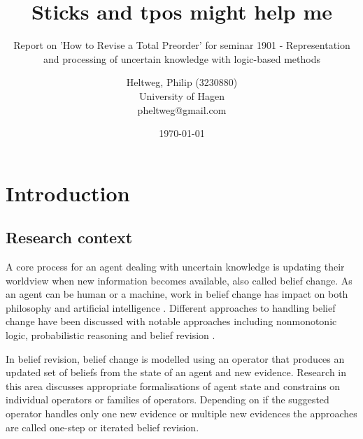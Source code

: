 \documentclass[english, 12pt]{scrartcl}
\theoremstyle{definition}
\theoremstyle{definition}
\theoremstyle{definition}
\begin{document}
\title{Sticks and tpos might help me}
\subtitle{Report on 'How to Revise a Total Preorder' \cite{Booth2011} for seminar 1901 - Representation and processing of uncertain knowledge with logic-based methods}
\author{
	Heltweg, Philip (3230880) \\
	University of Hagen \\
	pheltweg@gmail.com
}
\date{\today}
\maketitle


\newpage

\tableofcontents

\newpage

\section{Introduction}



\subsection{Research context}
A core process for an agent dealing with uncertain knowledge is updating their worldview when new information becomes available, also called belief change. As an agent can be human or a machine, work in belief change has impact on both philosophy and artificial intelligence \cite{Ferme2011}. Different approaches to handling belief change have been discussed with notable approaches including nonmonotonic logic, probabilistic reasoning and belief revision \cite{Darwiche1997}.

In belief revision, belief change is modelled using an operator that produces an updated set of beliefs from the state of an agent and new evidence. Research in this area discusses appropriate formalisations of agent state and constrains on individual operators or families of operators. Depending on if the suggested operator handles only one new evidence or multiple new evidences the approaches are called one-step or iterated belief revision.
\end{document}
